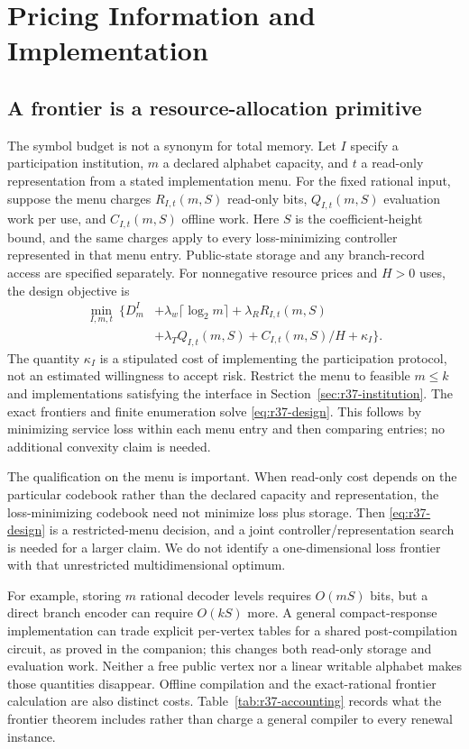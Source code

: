 \section{Pricing Information and Implementation}\label{sec:r37-resources}
\subsection{A frontier is a resource-allocation primitive}
The symbol budget is not a synonym for total memory. Let $I$ specify a participation institution, $m$ a declared alphabet capacity, and $t$ a read-only representation from a stated implementation menu. For the fixed rational input, suppose the menu charges $R_{I,t}(m,S)$ read-only bits, $Q_{I,t}(m,S)$ evaluation work per use, and $C_{I,t}(m,S)$ offline work. Here $S$ is the coefficient-height bound, and the same charges apply to every loss-minimizing controller represented in that menu entry. Public-state storage and any branch-record access are specified separately. For nonnegative resource prices and $H>0$ uses, the design objective is
\begin{align}\label{eq:r37-design}
 \min_{I,m,t}\ \bigl\{D_m^I
 &+\lambda_w\lceil\log_2m\rceil
 +\lambda_R R_{I,t}(m,S)\nonumber\\
 &+\lambda_T Q_{I,t}(m,S)+C_{I,t}(m,S)/H+\kappa_I\bigr\}.
\end{align}
The quantity $\kappa_I$ is a stipulated cost of implementing the participation protocol, not an estimated willingness to accept risk. Restrict the menu to feasible $m\leq k$ and implementations satisfying the interface in Section~\ref{sec:r37-institution}. The exact frontiers and finite enumeration solve \eqref{eq:r37-design}. This follows by minimizing service loss within each menu entry and then comparing entries; no additional convexity claim is needed.

The qualification on the menu is important. When read-only cost depends on the particular codebook rather than the declared capacity and representation, the loss-minimizing codebook need not minimize loss plus storage. Then \eqref{eq:r37-design} is a restricted-menu decision, and a joint controller/representation search is needed for a larger claim. We do not identify a one-dimensional loss frontier with that unrestricted multidimensional optimum.

For example, storing $m$ rational decoder levels requires $O(mS)$ bits, but a direct branch encoder can require $O(kS)$ more. A general compact-response implementation can trade explicit per-vertex tables for a shared post-compilation circuit, as proved in the companion; this changes both read-only storage and evaluation work. Neither a free public vertex nor a linear writable alphabet makes those quantities disappear. Offline compilation and the exact-rational frontier calculation are also distinct costs. Table~\ref{tab:r37-accounting} records what the frontier theorem includes rather than charge a general compiler to every renewal instance.

